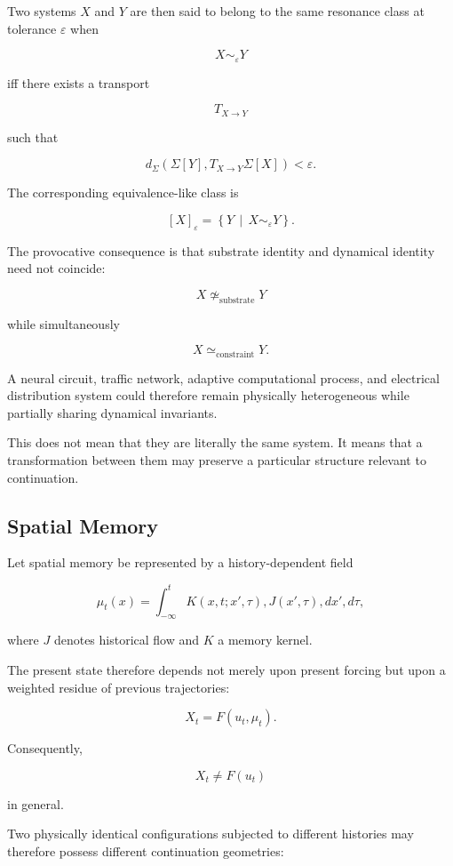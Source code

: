 \documentclass[11pt]{article}
\begin{document}
Two systems $X$ and $Y$ are then said to belong to the same resonance class at tolerance $\varepsilon$ when

\[
X\sim_{\varepsilon}Y
\]

iff there exists a transport

\[
T_{X\rightarrow Y}
\]

such that

\[
d_{\Sigma}
\left(
\Sigma[Y],
T_{X\rightarrow Y}\Sigma[X]
\right)
<\varepsilon.
\]

The corresponding equivalence-like class is

\[
[X]_{\varepsilon}
=
\left\{
Y
\,\middle|\,
X\sim_{\varepsilon}Y
\right\}.
\]

The provocative consequence is that substrate identity and dynamical identity need not coincide:

\[
X\not\simeq_{\mathrm{substrate}}Y
\]

while simultaneously

\[
X\simeq_{\mathrm{constraint}}Y.
\]

A neural circuit, traffic network, adaptive computational process, and electrical distribution system could therefore remain physically heterogeneous while partially sharing dynamical invariants.

This does not mean that they are literally the same system. It means that a transformation between them may preserve a particular structure relevant to continuation.

\subsection{Spatial Memory}

Let spatial memory be represented by a history-dependent field

\[
\mu_t(x)
=
\int_{-\infty}^{t}
K(x,t;x',\tau),
J(x',\tau)
,dx',d\tau,
\]

where $J$ denotes historical flow and $K$ a memory kernel.

The present state therefore depends not merely upon present forcing but upon a weighted residue of previous trajectories:

\[
X_t
=
F\!\left(
u_t,
\mu_t
\right).
\]

Consequently,

\[
X_t
\neq
F(u_t)
\]

in general.

Two physically identical configurations subjected to different histories may therefore possess different continuation geometries:
\end{document}
